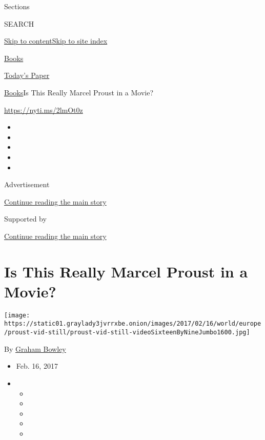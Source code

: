 Sections

SEARCH

\protect\hyperlink{site-content}{Skip to
content}\protect\hyperlink{site-index}{Skip to site index}

\href{https://www.nytimes3xbfgragh.onion/section/books}{Books}

\href{https://myaccount.nytimes3xbfgragh.onion/auth/login?response_type=cookie\&client_id=vi}{}

\href{https://www.nytimes3xbfgragh.onion/section/todayspaper}{Today's
Paper}

\href{/section/books}{Books}\textbar{}Is This Really Marcel Proust in a
Movie?

\url{https://nyti.ms/2lmOt0z}

\begin{itemize}
\item
\item
\item
\item
\item
\end{itemize}

Advertisement

\protect\hyperlink{after-top}{Continue reading the main story}

Supported by

\protect\hyperlink{after-sponsor}{Continue reading the main story}

\hypertarget{is-this-really-marcel-proust-in-a-movie}{%
\section{Is This Really Marcel Proust in a
Movie?}\label{is-this-really-marcel-proust-in-a-movie}}

\texttt{[image: https://static01.graylady3jvrrxbe.onion/images/2017/02/16/world/europe/proust-vid-still/proust-vid-still-videoSixteenByNineJumbo1600.jpg]}

By \href{http://www.nytimes3xbfgragh.onion/by/graham-bowley}{Graham
Bowley}

\begin{itemize}
\item
  Feb. 16, 2017
\item
  \begin{itemize}
  \item
  \item
  \item
  \item
  \item
  \end{itemize}
\end{itemize}


